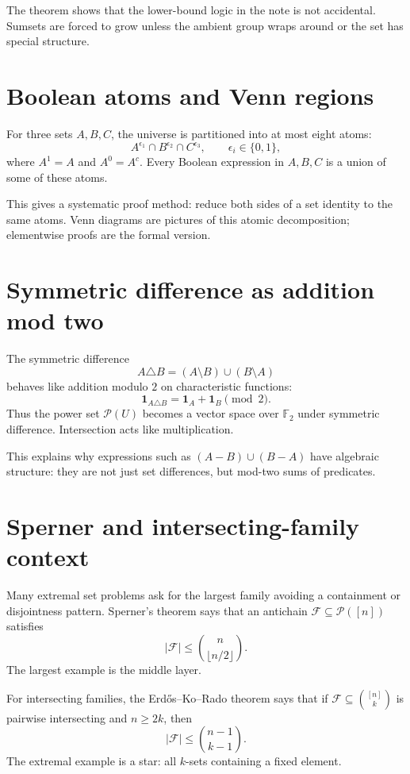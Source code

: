 The theorem shows that the lower-bound logic in the note is not accidental.  Sumsets are forced to grow unless the ambient group wraps around or the set has special structure.

\section{Boolean atoms and Venn regions}

For three sets \(A,B,C\), the universe is partitioned into at most eight atoms:
\[
  A^{\epsilon_1}\cap B^{\epsilon_2}\cap C^{\epsilon_3},\qquad
  \epsilon_i\in\{0,1\},
\]
where \(A^1=A\) and \(A^0=A^c\).  Every Boolean expression in \(A,B,C\) is a union of some of these atoms.

This gives a systematic proof method: reduce both sides of a set identity to the same atoms.  Venn diagrams are pictures of this atomic decomposition; elementwise proofs are the formal version.

\section{Symmetric difference as addition mod two}

The symmetric difference
\[
  A\triangle B=(A\setminus B)\cup(B\setminus A)
\]
behaves like addition modulo \(2\) on characteristic functions:
\[
  \mathbf 1_{A\triangle B}=\mathbf 1_A+\mathbf 1_B\pmod2.
\]
Thus the power set \(\mathcal P(U)\) becomes a vector space over \(\mathbb F_2\) under symmetric difference.  Intersection acts like multiplication.

This explains why expressions such as \((A-B)\cup(B-A)\) have algebraic structure: they are not just set differences, but mod-two sums of predicates.

\section{Sperner and intersecting-family context}

Many extremal set problems ask for the largest family avoiding a containment or disjointness pattern.  Sperner's theorem says that an antichain \(\mathcal F\subseteq\mathcal P([n])\) satisfies
\[
  |\mathcal F|\le \binom n{\lfloor n/2\rfloor}.
\]
The largest example is the middle layer.

For intersecting families, the Erdős--Ko--Rado theorem says that if \(\mathcal F\subseteq\binom{[n]}k\) is pairwise intersecting and \(n\ge2k\), then
\[
  |\mathcal F|\le\binom{n-1}{k-1}.
\]
The extremal example is a star: all \(k\)-sets containing a fixed element.

